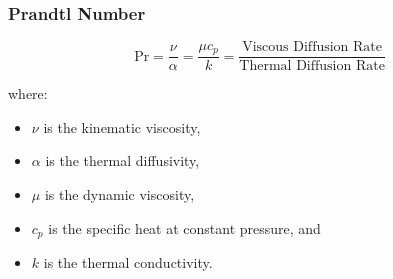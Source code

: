 

\subsubsection*{Prandtl Number}
\begin{definition}
 \[
    \text{Pr} = \frac{\nu}{\alpha} = \frac{\mu c_p}{k} =\frac{\text{Viscous Diffusion Rate}}{\text{Thermal Diffusion Rate}}
\]   
\end{definition}
%
where:
\begin{itemize}[-]
    \item $\nu$ is the kinematic viscosity,
    \item $\alpha$ is the thermal diffusivity,
    \item $\mu$ is the dynamic viscosity,
    \item $c_p$ is the specific heat at constant pressure, and
    \item $k$ is the thermal conductivity.
\end{itemize}


